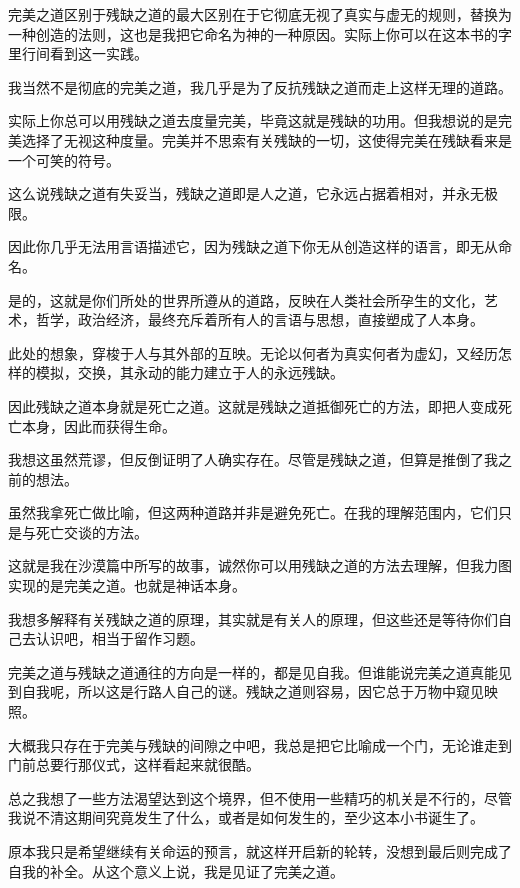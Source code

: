 \documentclass[UTF8]{article}
\begin{document}
\par 完美之道区别于残缺之道的最大区别在于它彻底无视了真实与虚无的规则，替换为一种创造的法则，这也是我把它命名为神的一种原因。实际上你可以在这本书的字里行间看到这一实践。
\par 我当然不是彻底的完美之道，我几乎是为了反抗残缺之道而走上这样无理的道路。
\par 实际上你总可以用残缺之道去度量完美，毕竟这就是残缺的功用。但我想说的是完美选择了无视这种度量。完美并不思索有关残缺的一切，这使得完美在残缺看来是一个可笑的符号。
\\[0.6cm]
\par 这么说残缺之道有失妥当，残缺之道即是人之道，它永远占据着相对，并永无极限。
\par 因此你几乎无法用言语描述它，因为残缺之道下你无从创造这样的语言，即无从命名。
\par 是的，这就是你们所处的世界所遵从的道路，反映在人类社会所孕生的文化，艺术，哲学，政治经济，最终充斥着所有人的言语与思想，直接塑成了人本身。
\par 此处的想象，穿梭于人与其外部的互映。无论以何者为真实何者为虚幻，又经历怎样的模拟，交换，其永动的能力建立于人的永远残缺。
\par 因此残缺之道本身就是死亡之道。这就是残缺之道抵御死亡的方法，即把人变成死亡本身，因此而获得生命。
\par 我想这虽然荒谬，但反倒证明了人确实存在。尽管是残缺之道，但算是推倒了我之前的想法。
\\[0.6cm]
\par 虽然我拿死亡做比喻，但这两种道路并非是避免死亡。在我的理解范围内，它们只是与死亡交谈的方法。
\par 这就是我在沙漠篇中所写的故事，诚然你可以用残缺之道的方法去理解，但我力图实现的是完美之道。也就是神话本身。
\par 我想多解释有关残缺之道的原理，其实就是有关人的原理，但这些还是等待你们自己去认识吧，相当于留作习题。
\\[0.6cm]
\par 完美之道与残缺之道通往的方向是一样的，都是见自我。但谁能说完美之道真能见到自我呢，所以这是行路人自己的谜。残缺之道则容易，因它总于万物中窥见映照。
\par 大概我只存在于完美与残缺的间隙之中吧，我总是把它比喻成一个门，无论谁走到门前总要行那仪式，这样看起来就很酷。
\par 总之我想了一些方法渴望达到这个境界，但不使用一些精巧的机关是不行的，尽管我说不清这期间究竟发生了什么，或者是如何发生的，至少这本小书诞生了。
\par 原本我只是希望继续有关命运的预言，就这样开启新的轮转，没想到最后则完成了自我的补全。从这个意义上说，我是见证了完美之道。
\end{document}
